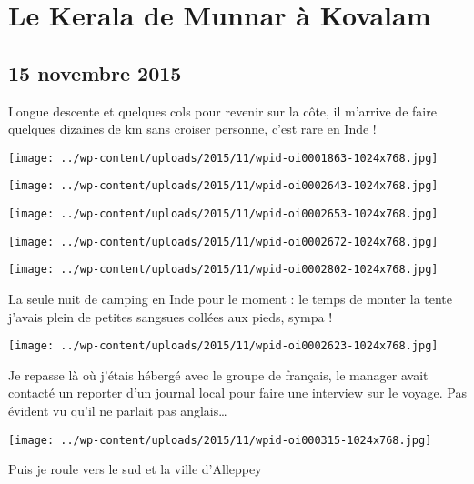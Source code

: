 \chapter{Le Kerala de Munnar à Kovalam}
\section*{15 novembre 2015}
Longue descente et quelques cols pour revenir sur la côte, il m'arrive de faire quelques dizaines de km sans croiser personne, c'est rare en Inde ! \newline
 \newline
\centerline{\texttt{[image: ../wp-content/uploads/2015/11/wpid-oi0001863-1024x768.jpg]} } 
 \newline
 \newline
\centerline{\texttt{[image: ../wp-content/uploads/2015/11/wpid-oi0002643-1024x768.jpg]} } 
 \newline
 \newline
\centerline{\texttt{[image: ../wp-content/uploads/2015/11/wpid-oi0002653-1024x768.jpg]} } 
 \newline
 \newline
\centerline{\texttt{[image: ../wp-content/uploads/2015/11/wpid-oi0002672-1024x768.jpg]} } 
 \newline
 \newline
\centerline{\texttt{[image: ../wp-content/uploads/2015/11/wpid-oi0002802-1024x768.jpg]} } 
 \newline
 La seule nuit de camping en Inde pour le moment : le temps de monter la tente j'avais plein de petites sangsues collées aux pieds, sympa ! \newline
 \newline
\centerline{\texttt{[image: ../wp-content/uploads/2015/11/wpid-oi0002623-1024x768.jpg]} } 
 \newline
 Je repasse là où j'étais hébergé avec le groupe de français, le manager avait contacté un reporter d'un journal local pour faire une interview sur le voyage. Pas évident vu qu'il ne parlait pas anglais… \newline
 \newline
\centerline{\texttt{[image: ../wp-content/uploads/2015/11/wpid-oi000315-1024x768.jpg]} } 
 \newline
 Puis je roule vers le sud et la ville d'Alleppey \newline
 \newline
